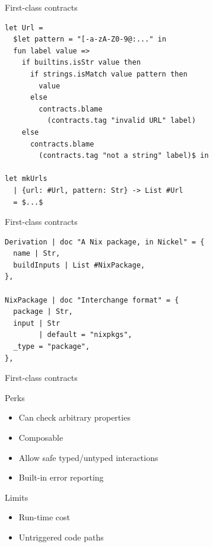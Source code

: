 \documentclass[a4paper]{beamer}
\begin{document}
\begin{frame}[fragile]{First-class contracts}
\begin{lstlisting}[language=Nickel]
let Url =
  $let pattern = "[-a-zA-Z0-9@:..." in
  fun label value =>
    if builtins.isStr value then
      if strings.isMatch value pattern then
        value
      else
        contracts.blame
          (contracts.tag "invalid URL" label)
    else
      contracts.blame
        (contracts.tag "not a string" label)$ in

let mkUrls
  | {url: #Url, pattern: Str} -> List #Url
  = $...$
\end{lstlisting}
\end{frame}

\begin{frame}[fragile]{First-class contracts}
\begin{lstlisting}[language=Nickel]
Derivation | doc "A Nix package, in Nickel" = {
  name | Str,
  buildInputs | List #NixPackage,
},

NixPackage | doc "Interchange format" = {
  package | Str,
  input | Str
        | default = "nixpkgs",
  _type = "package",
},
\end{lstlisting}
\end{frame}

%

\begin{frame}{First-class contracts}
    \begin{exampleblock}{Perks}
        \begin{itemize}
            \item Can check arbitrary properties
            \item Composable
            \item Allow safe typed/untyped interactions
            \item Built-in error reporting
        \end{itemize}
    \end{exampleblock}

    \begin{alertblock}{Limits}
        \begin{itemize}
            \item Run-time cost
            \item Untriggered code paths
        \end{itemize}
    \end{alertblock}
\end{frame}
\end{document}
